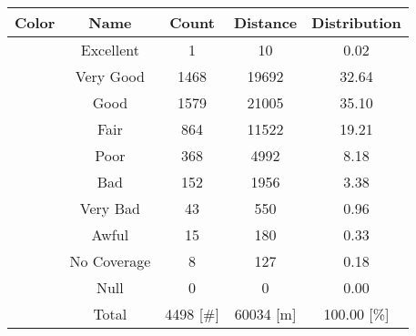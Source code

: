 \begin{tabular}{|c|c|c|c|c|}\hline
\rowcolor{Plum!20}
Color&Name&Count&Distance&Distribution\\\hline\hline
\cellcolor[HTML]{00703c} &Excellent&1&10&0.02\\\hline
\cellcolor[HTML]{00a032} &Very Good&1468&19692&32.64\\\hline
\cellcolor[HTML]{00d228} &Good&1579&21005&35.10\\\hline
\cellcolor[HTML]{ffff00} &Fair&864&11522&19.21\\\hline
\cellcolor[HTML]{ffaa00} &Poor&368&4992&8.18\\\hline
\cellcolor[HTML]{fa6400} &Bad&152&1956&3.38\\\hline
\cellcolor[HTML]{dc143c} &Very Bad&43&550&0.96\\\hline
\cellcolor[HTML]{820000} &Awful&15&180&0.33\\\hline
\cellcolor[HTML]{aaaaaa} &No Coverage&8&127&0.18\\\hline
\cellcolor[HTML]{000000} &Null&0&0&0.00\\\hline
\cellcolor[HTML]{ffffff} &Total&4498 [\#]&60034 [m]&100.00 [\%]\\\hline
\end{tabular}
